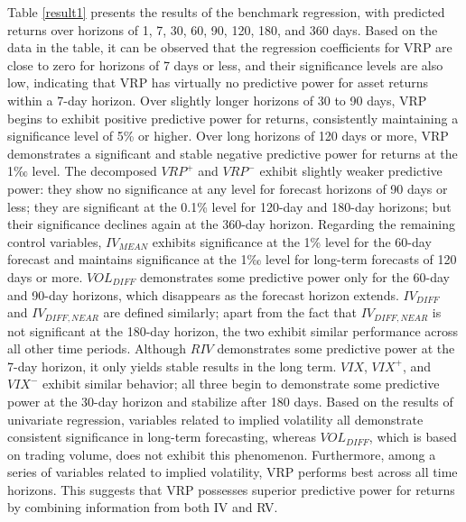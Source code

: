 \documentclass[a4paper, 12pt]{article}    %
\begin{document}
        Table \ref{result1} presents the results of the benchmark regression, with predicted returns over horizons of 1, 7, 30, 60, 90, 120, 180, and 360 days. Based on the data in the table, it can be observed that the regression coefficients for VRP are close to zero for horizons of 7 days or less, and their significance levels are also low, indicating that VRP has virtually no predictive power for asset returns within a 7-day horizon. Over slightly longer horizons of 30 to 90 days, VRP begins to exhibit positive predictive power for returns, consistently maintaining a significance level of 5\% or higher. Over long horizons of 120 days or more, VRP demonstrates a significant and stable negative predictive power for returns at the 1‰ level. The decomposed $VRP^+$ and $VRP^-$ exhibit slightly weaker predictive power: they show no significance at any level for forecast horizons of 90 days or less; they are significant at the 0.1\% level for 120-day and 180-day horizons; but their significance declines again at the 360-day horizon.
        Regarding the remaining control variables, $IV_{MEAN}$ exhibits significance at the 1\% level for the 60-day forecast and maintains significance at the 1‰ level for long-term forecasts of 120 days or more. $VOL_{DIFF}$ demonstrates some predictive power only for the 60-day and 90-day horizons, which disappears as the forecast horizon extends. $IV_{DIFF}$ and $IV_{DIFF,NEAR}$ are defined similarly; apart from the fact that $IV_{DIFF,NEAR}$ is not significant at the 180-day horizon, the two exhibit similar performance across all other time periods. Although $RIV$ demonstrates some predictive power at the 7-day horizon, it only yields stable results in the long term. $VIX$, $VIX^+$, and $VIX^-$ exhibit similar behavior; all three begin to demonstrate some predictive power at the 30-day horizon and stabilize after 180 days.
        Based on the results of univariate regression, variables related to implied volatility all demonstrate consistent significance in long-term forecasting, whereas $VOL_{DIFF}$, which is based on trading volume, does not exhibit this phenomenon. Furthermore, among a series of variables related to implied volatility, VRP performs best across all time horizons. This suggests that VRP possesses superior predictive power for returns by combining information from both IV and RV.
\end{document}
